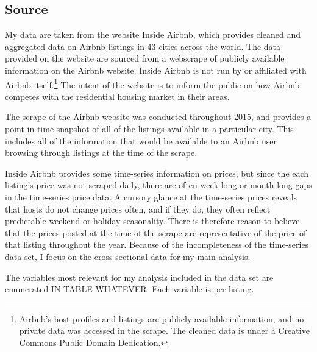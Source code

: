 \subsection{Source} %

My data are taken from the website Inside Airbnb, which provides cleaned and aggregated data on Airbnb listings in 43 cities across the world.\cite{insideairbnb} The data provided on the website are sourced from a webscrape of publicly available information on the Airbnb website. Inside Airbnb is not run by or affiliated with Airbnb itself.\footnote{Airbnb's host profiles and listings are publicly available information, and no private data was accessed in the scrape. The cleaned data is under a Creative Commons Public Domain Dedication.} The intent of the website is to inform the public on how Airbnb competes with the residential housing market in their areas. 

The scrape of the Airbnb website was conducted throughout 2015, and provides a point-in-time snapshot of all of the listings available in a particular city. This includes all of the information that would be available to an Airbnb user browsing through listings at the time of the scrape. 

Inside Airbnb provides some time-series information on prices, but since the each listing's price was not scraped daily, there are often week-long or month-long gaps in the time-series price data. A cursory glance at the time-series prices reveals that hosts do not change prices often, and if they do, they often reflect predictable weekend or holiday seasonality. There is therefore reason to believe that the prices posted at the time of the scrape are representative of the price of that listing throughout the year. Because of the incompleteness of the time-series data set, I focus on the cross-sectional data for my main analysis.  

The variables most relevant for my analysis included in the data set are enumerated IN TABLE WHATEVER. Each variable is per listing. 

